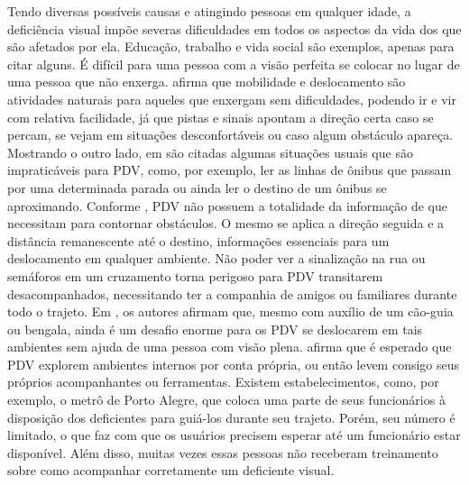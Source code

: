 \documentclass[english,brazilian]{UNISINOSmonografia}
\begin{document}
Tendo diversas possíveis causas e atingindo pessoas em qualquer idade, a deficiência visual impõe severas dificuldades em todos os aspectos da vida dos que são afetados por ela. Educação, trabalho e vida social são exemplos, apenas para citar alguns. É difícil para uma pessoa com a visão perfeita se colocar no lugar de uma pessoa que não enxerga.  afirma que mobilidade e deslocamento são atividades naturais para aqueles que enxergam sem dificuldades, podendo ir e vir com relativa facilidade, já que pistas e sinais apontam a direção certa caso se percam, se vejam em situações desconfortáveis ou caso algum obstáculo apareça. Mostrando o outro lado, em  são citadas algumas situações usuais que são impraticáveis para PDV, como, por exemplo, ler as linhas de ônibus que passam por uma determinada parada ou ainda ler o destino de um ônibus se aproximando. Conforme , PDV não possuem a totalidade da informação de que necessitam para contornar obstáculos. O mesmo se aplica a direção seguida e a distância remanescente até o destino, informações essenciais para um deslocamento em qualquer ambiente. Não poder ver a sinalização na rua ou semáforos em um cruzamento torna perigoso para PDV transitarem desacompanhados, necessitando ter a companhia de amigos ou familiares durante todo o trajeto. 
Em , os autores afirmam que, mesmo com auxílio de um cão-guia ou bengala, ainda é um desafio enorme para os PDV se deslocarem em tais ambientes sem ajuda de uma pessoa com visão plena. 
 afirma que é esperado que PDV explorem ambientes internos por conta própria, ou então levem consigo seus próprios acompanhantes ou ferramentas. Existem estabelecimentos, como, por exemplo, o metrô de Porto Alegre, que coloca uma parte de seus funcionários à disposição dos deficientes para guiá-los durante seu trajeto. Porém, seu número é limitado, o que faz com que os usuários precisem esperar até um funcionário estar disponível. Além disso, muitas vezes essas pessoas não receberam treinamento sobre como acompanhar corretamente um deficiente visual.
\end{document}
